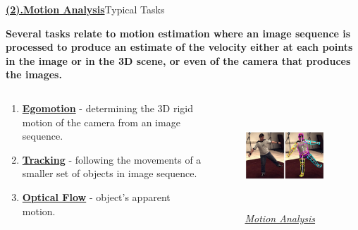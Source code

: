 \documentclass{beamer}
\begin{document}
{\begin{frame}{\textbf{\underline{(2).Motion Analysis}}}{Typical Tasks}\pause

\begin{block}{}
\textbf{Several tasks relate to motion estimation where an image sequence is processed to produce an estimate of the velocity either at each points in the image or in the 3D scene, or even of the camera that produces the images.}\pause
\end{block}
\begin{columns}
\centering
\begin{example}\pause
\begin{enumerate}
\item \textbf{\underline{Egomotion}} - determining the 3D rigid motion of the camera from an image sequence.\pause
\item \textbf{\underline{Tracking}} - following the movements of a smaller set of objects in image sequence.\pause
\item \textbf{\underline{Optical Flow}} -  object's apparent motion.\pause
\end{enumerate}
\end{example}
\begin{figure}
\centering
\includegraphics[width=0.9\textwidth,height=4cm]{MotioAna.jpeg}
\caption{\underline{\textit{Motion Analysis}}}
\end{figure}
\end{columns}
\end{frame}


}
\end{document}
